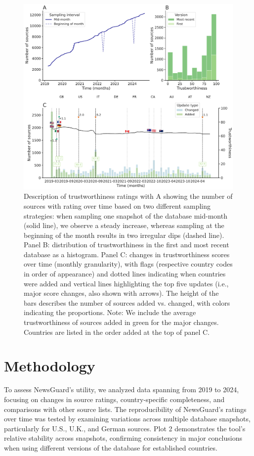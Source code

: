 \documentclass{article}
\begin{document}
\begin{figure}[H]
    \centering
    \includegraphics[width=\textwidth]{figures/trustworthiness_panel.pdf}
    \caption{Description of trustworthiness ratings with A showing the number of sources with rating over time based on two different sampling strategies: when sampling one snapshot of the database mid-month (solid line), we observe a steady increase, whereas sampling at the beginning of the month results in two irregular dips (dashed line). Panel B: distribution of trustworthiness in the first and most recent database as a histogram. Panel C: changes in trustworthiness scores over time (monthly granularity), with flags (respective country codes in order of appearance) and dotted lines indicating when countries were added and vertical lines highlighting the top five updates (i.e., major score changes, also shown with arrows). The height of the bars describes the number of sources added vs. changed, with colors indicating the proportions. Note: We include the average trustworthiness of sources added in green for the major changes. Countries are listed in the order added at the top of panel C.}
    \label{fig:trustworthiness_panel}
\end{figure}

\section{Methodology}
To assess NewsGuard's utility, we analyzed data spanning from 2019 to 2024, focusing on changes in source ratings, country-specific completeness, and comparisons with other source lists. 
The reproducibility of NewsGuard’s ratings over time was tested by examining variations across multiple database snapshots, particularly for U.S., U.K., and German sources. 
Plot 2 demonstrates the tool’s relative stability across snapshots, confirming consistency in major conclusions when using different versions of the database for established countries.
\end{document}
